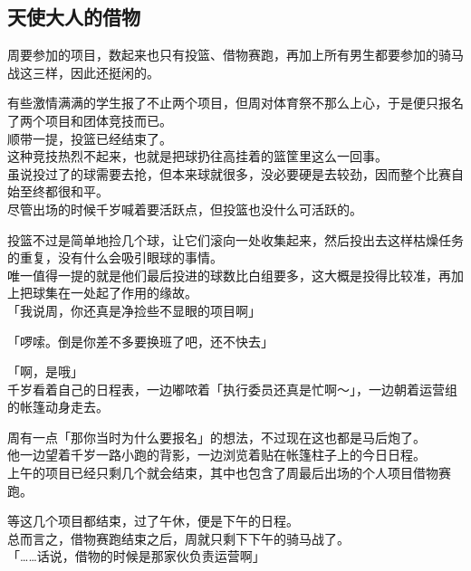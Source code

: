\subsection{天使大人的借物}

周要参加的项目，数起来也只有投篮、借物赛跑，再加上所有男生都要参加的骑马战这三样，因此还挺闲的。

有些激情满满的学生报了不止两个项目，但周对体育祭不那么上心，于是便只报名了两个项目和团体竞技而已。\\

顺带一提，投篮已经结束了。\\

这种竞技热烈不起来，也就是把球扔往高挂着的篮筐里这么一回事。\\

虽说投过了的球需要去抢，但本来球就很多，没必要硬是去较劲，因而整个比赛自始至终都很和平。\\

尽管出场的时候千岁喊着要活跃点，但投篮也没什么可活跃的。

投篮不过是简单地捡几个球，让它们滚向一处收集起来，然后投出去这样枯燥任务的重复，没有什么会吸引眼球的事情。\\

唯一值得一提的就是他们最后投进的球数比白组要多，这大概是投得比较准，再加上把球集在一处起了作用的缘故。\\

「我说周，你还真是净捡些不显眼的项目啊」

「啰嗦。倒是你差不多要换班了吧，还不快去」

「啊，是哦」\\

千岁看着自己的日程表，一边嘟哝着「执行委员还真是忙啊～」，一边朝着运营组的帐篷动身走去。

周有一点「那你当时为什么要报名」的想法，不过现在这也都是马后炮了。\\

他一边望着千岁一路小跑的背影，一边浏览着贴在帐篷柱子上的今日日程。\\

上午的项目已经只剩几个就会结束，其中也包含了周最后出场的个人项目借物赛跑。

等这几个项目都结束，过了午休，便是下午的日程。\\

总而言之，借物赛跑结束之后，周就只剩下下午的骑马战了。\\

「……话说，借物的时候是那家伙负责运营啊」\\

